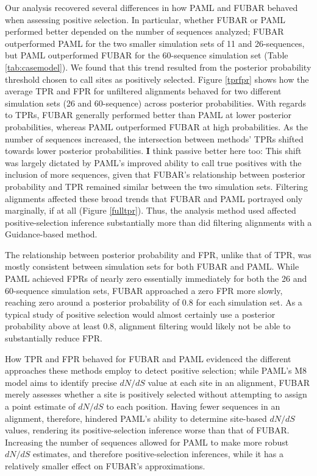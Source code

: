\documentclass[10pt]{article}
\begin{document}
Our analysis recovered several differences in how PAML and FUBAR behaved when assessing positive selection. In particular, whether FUBAR or PAML performed better depended on the number of sequences analyzed; FUBAR outperformed PAML for the two smaller simulation sets of 11 and 26-sequences, but PAML outperformed FUBAR for the 60-sequence simulation set (Table \ref{tab:casemodel}). We found that this trend resulted from the posterior probability threshold chosen to call sites as positively selected. Figure \ref{tprfpr} shows how the average TPR and FPR for unfiltered alignments behaved for two different simulation sets (26 and 60-sequence) across posterior probabilities. With regards to TPRs,
FUBAR generally performed better than PAML at lower posterior probabilities, whereas PAML outperformed FUBAR at high probabilities. As the number of sequences increased, the intersection between methods' TPRs shifted towards lower posterior probabilities. {\textbf I think passive better here too:} This shift was largely dictated by PAML's improved ability to call true positives with the inclusion of more sequences, given that FUBAR's relationship between posterior probability and TPR remained similar between the two simulation sets.  Filtering alignments affected these broad trends that FUBAR and PAML portrayed only marginally, if at all (Figure \ref{fulltpr}). Thus, the analysis method used affected positive-selection inference substantially more than did filtering  alignments with a Guidance-based method. 

The relationship between posterior probability and FPR, unlike that of TPR, was mostly consistent between simulation sets for both FUBAR and PAML. While PAML achieved FPRs of nearly zero essentially immediately for both the 26 and 60-sequence simulation sets, FUBAR approached a zero FPR more slowly, reaching zero around a posterior probability of 0.8 for each simulation set. As a typical study of positive selection would almost certainly use a posterior probability above at least 0.8, alignment filtering would likely not be able to substantially reduce FPR.

How TPR and FPR behaved for FUBAR and PAML evidenced the different approaches these methods employ to detect positive selection; while PAML's M8 model aims to identify precise $dN/dS$ value at each site in an alignment, FUBAR merely assesses whether a site is positively selected without attempting to assign a point estimate of $dN/dS$ to each position. Having fewer sequences in an alignment, therefore, hindered PAML's ability to determine site-based $dN/dS$ values, rendering its positive-selection inference worse than that of FUBAR. Increasing the number of sequences allowed for PAML to make more robust $dN/dS$ estimates, and therefore positive-selection inferences, while it has a relatively smaller effect on FUBAR's approximations.
\end{document}
